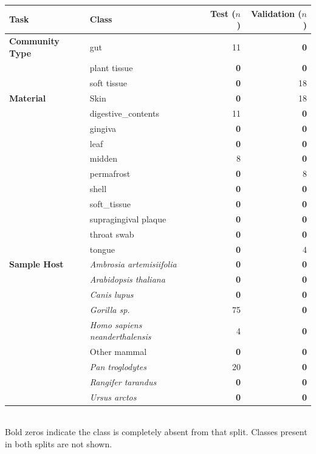 \centering
\caption{Training-vocabulary classes absent from the held-out test set (n\,=\,523) and/or the validation set (n\,=\,360). For each class the number of samples in each split is shown. Classes with zero support contribute F1\,=\,0 under standard macro-averaging; the F1$^{\dagger}$ values in Table~\ref{tab:performance} exclude these classes to give a fair reflection of per-class accuracy on actually observed labels.}
\label{tab:zero_support}
\small
\begin{tabular}{llrr}
\toprule
Task & Class & Test ($n$) & Validation ($n$) \\
\midrule
\textbf{Community Type} & gut & 11 & \textbf{0} \\
 & plant tissue & \textbf{0} & \textbf{0} \\
 & soft tissue & \textbf{0} & 18 \\
\addlinespace
\textbf{Material} & Skin & \textbf{0} & 18 \\
 & digestive\_contents & 11 & \textbf{0} \\
 & gingiva & \textbf{0} & \textbf{0} \\
 & leaf & \textbf{0} & \textbf{0} \\
 & midden & 8 & \textbf{0} \\
 & permafrost & \textbf{0} & 8 \\
 & shell & \textbf{0} & \textbf{0} \\
 & soft\_tissue & \textbf{0} & \textbf{0} \\
 & supragingival plaque & \textbf{0} & \textbf{0} \\
 & throat swab & \textbf{0} & \textbf{0} \\
 & tongue & \textbf{0} & 4 \\
\addlinespace
\textbf{Sample Host} & \textit{Ambrosia artemisiifolia} & \textbf{0} & \textbf{0} \\
 & \textit{Arabidopsis thaliana} & \textbf{0} & \textbf{0} \\
 & \textit{Canis lupus} & \textbf{0} & \textbf{0} \\
 & \textit{Gorilla sp.} & 75 & \textbf{0} \\
 & \textit{Homo sapiens neanderthalensis} & 4 & \textbf{0} \\
 & Other mammal & \textbf{0} & \textbf{0} \\
 & \textit{Pan troglodytes} & 20 & \textbf{0} \\
 & \textit{Rangifer tarandus} & \textbf{0} & \textbf{0} \\
 & \textit{Ursus arctos} & \textbf{0} & \textbf{0} \\
\bottomrule
\end{tabular}
\\[2mm]
{\footnotesize Bold zeros indicate the class is completely absent from that split. Classes present in both splits are not shown.}
